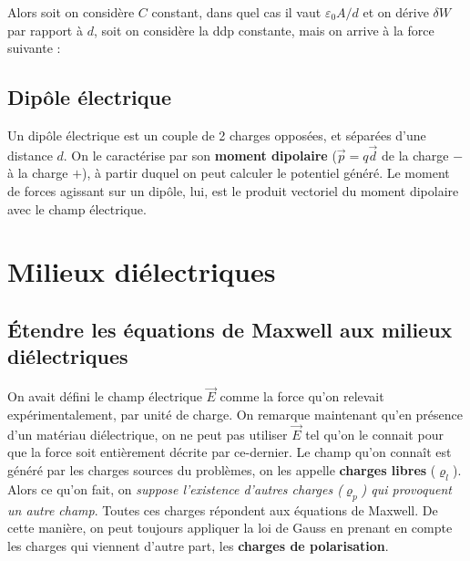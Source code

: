\documentclass[12pt]{book}
\begin{document}
Alors soit on considère $C$ constant, dans quel cas il vaut $\varepsilon_0 A/d$ et on dérive $\delta W$ par rapport à $d$, soit on considère la ddp constante, mais on arrive à la force suivante :

\section{Dipôle électrique}
Un dipôle électrique est un couple de 2 charges opposées, et séparées d'une distance $d$. On le caractérise par son \textbf{moment dipolaire} ($\vec{p} = q\vec{d}$ de la charge $-$ à la charge $+$), à partir duquel on peut calculer le potentiel généré. Le moment de forces agissant sur un dipôle, lui, est le produit vectoriel du moment dipolaire avec le champ électrique.

\chapter{Milieux diélectriques}
\section{Étendre les équations de Maxwell aux milieux diélectriques}
On avait défini le champ électrique $\vec{E}$ comme la force qu'on relevait expérimentalement, par unité de charge. On remarque maintenant qu'en présence d'un matériau diélectrique, on ne peut pas utiliser $\vec{E}$ tel qu'on le connait pour que la force soit entièrement décrite par ce-dernier.  Le champ qu'on connaît est généré par les charges sources du problèmes, on les appelle \textbf{charges libres} ($\varrho_l$). Alors ce qu'on fait, on \textit{suppose l'existence d'autres charges  ($\varrho_p$) qui provoquent un autre champ}.  Toutes ces charges répondent aux équations de Maxwell.  De cette manière, on peut toujours appliquer la loi de Gauss en prenant en compte les charges qui viennent d'autre part, les \textbf{charges de polarisation}.
\end{document}
